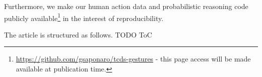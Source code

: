 Furthermore, we make our human action data and probabilistic reasoning code publicly available\footnote{\url{https://github.com/gsaponaro/tcds-gestures} - this page access will be made available at publication time.} in the interest of reproducibility.

The article is structured as follows. TODO ToC


